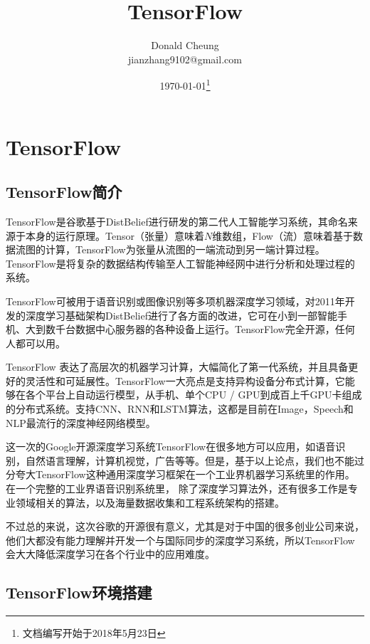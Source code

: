 \ifx\engineeringnotes\undefined
    \providecommand{\notesroot}{../..}
    \providecommand{\linuxroot}{.}

    \title{TensorFlow}
    \author{Donald Cheung\\jianzhang9102@gmail.com}
    \date{\today\footnote{文档编写开始于2018年5月23日}}

    
\else
    \providecommand{\linuxroot}{\engineeringroot/tensorflow}
\fi

\chapter{TensorFlow}
\section{TensorFlow简介}
TensorFlow是谷歌基于DistBelief进行研发的第二代人工智能学习系统，其命名来源于本身的运行原理。Tensor（张量）意味着$N$维数组，Flow（流）意味着基于数据流图的计算，TensorFlow为张量从流图的一端流动到另一端计算过程。TensorFlow是将复杂的数据结构传输至人工智能神经网中进行分析和处理过程的系统。

TensorFlow可被用于语音识别或图像识别等多项机器深度学习领域，对2011年开发的深度学习基础架构DistBelief进行了各方面的改进，它可在小到一部智能手机、大到数千台数据中心服务器的各种设备上运行。TensorFlow完全开源，任何人都可以用。

TensorFlow 表达了高层次的机器学习计算，大幅简化了第一代系统，并且具备更好的灵活性和可延展性。TensorFlow一大亮点是支持异构设备分布式计算，它能够在各个平台上自动运行模型，从手机、单个CPU / GPU到成百上千GPU卡组成的分布式系统。支持CNN、RNN和LSTM算法，这都是目前在Image，Speech和NLP最流行的深度神经网络模型。

这一次的Google开源深度学习系统TensorFlow在很多地方可以应用，如语音识别，自然语言理解，计算机视觉，广告等等。但是，基于以上论点，我们也不能过分夸大TensorFlow这种通用深度学习框架在一个工业界机器学习系统里的作用。在一个完整的工业界语音识别系统里， 除了深度学习算法外，还有很多工作是专业领域相关的算法，以及海量数据收集和工程系统架构的搭建。

不过总的来说，这次谷歌的开源很有意义，尤其是对于中国的很多创业公司来说，他们大都没有能力理解并开发一个与国际同步的深度学习系统，所以TensorFlow会大大降低深度学习在各个行业中的应用难度。

\section{TensorFlow环境搭建}

